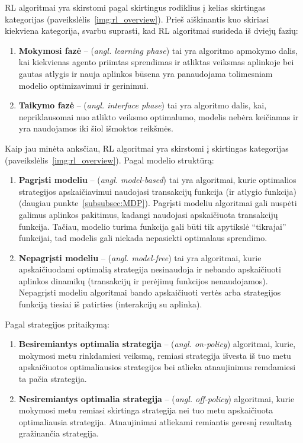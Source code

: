 \documentclass{VUMIFPSbakalaurinis}
\begin{document}
{	RL algoritmai yra skirstomi pagal skirtingus rodiklius į kelias skirtingas kategorijas (paveikslėlis~\ref{img:rl_overview}). Prieš aiškinantis kuo skiriasi kiekviena kategorija, svarbu suprasti, kad RL algoritmai susideda iš dviejų fazių:
	
	\begin{enumerate}
		\item \textbf{Mokymosi fazė} -- (\textit{angl. learning phase}) tai yra algoritmo apmokymo dalis, kai kiekvienas agento priimtas sprendimas ir atliktas veiksmas aplinkoje bei gautas atlygis ir nauja aplinkos būsena yra panaudojama tolimesniam modelio optimizavimui ir gerinimui.
		\item \textbf{Taikymo fazė} -- (\textit{angl. interface phase}) tai yra algoritmo dalis, kai, nepriklausomai nuo atlikto veiksmo optimalumo, modelis nebėra keičiamas ir yra naudojamos iki šiol išmoktos reikšmės.
	\end{enumerate}

	 Kaip jau minėta anksčiau, RL algoritmai yra skirstomi į skirtingas kategorijas (paveikslėlis~\ref{img:rl_overview}). Pagal modelio struktūrą:
	 
	\begin{enumerate}
		\item \textbf{Pagrįsti modeliu} -- (\textit{angl. model-based}) tai yra algoritmai, kurie optimalios strategijos apskaičiavimui naudojasi transakcijų funkcija (ir atlygio funkcija) (daugiau punkte~\ref{subsubsec:MDP}). Pagrįsti modeliu algoritmai gali nuspėti galimus aplinkos pakitimus, kadangi naudojasi apskaičiuota transakcijų funkcija. Tačiau, modelio turima funkcija gali būti tik apytikslė \enquote{tikrajai} funkcijai, tad modelis gali niekada nepasiekti optimalaus sprendimo. 
		\item \textbf{Nepagrįsti modeliu} -- (\textit{angl. model-free}) tai yra algoritmai, kurie apskaičiuodami optimalią strategija nesinaudoja ir nebando apskaičiuoti aplinkos dinamikų (transakcijų ir perėjimų funkcijos nenaudojamos). Nepagrįsti modeliu algoritmai bando apskaičiuoti vertės arba strategijos funkciją tiesiai iš patirties (interakcijų su aplinka).
	\end{enumerate}

	Pagal strategijos pritaikymą:
	
	\begin{enumerate}
		\item \textbf{Besiremiantys optimalia strategija} -- (\textit{angl. on-policy}) algoritmai, kurie, mokymosi metu rinkdamiesi veiksmą, remiasi strategija išvesta iš tuo metu apskaičiuotos optimaliausios strategijos bei atlieka atnaujinimus remdamiesi ta pačia strategija.
		\item \textbf{Nesiremiantys optimalia strategija} -- (\textit{angl. off-policy}) algoritmai, kurie mokymosi metu remiasi skirtinga strategija nei tuo metu apskaičiuota optimaliausia strategija. Atnaujinimai atliekami remiantis geresnį rezultatą gražinančia strategija.
	\end{enumerate}

}
\end{document}
